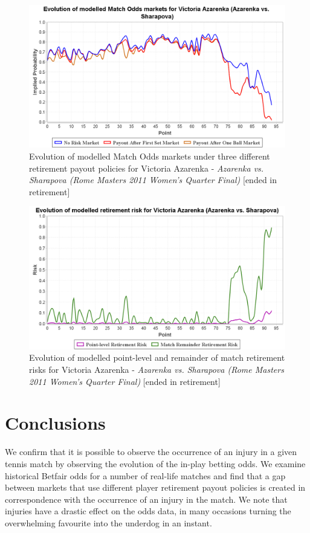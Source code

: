\documentclass[authoryear, 12pt]{elsarticle}
\begin{document}
\begin{figure}[H]
  \centering \includegraphics[width=12.3cm]{matches/azarenkasharapovamodel}
  \caption{Evolution of modelled Match Odds markets under three different retirement payout policies for Victoria Azarenka - \textit{Azarenka vs. Sharapova (Rome Masters 2011 Women's Quarter Final)} [ended in retirement]}
  \label{azarenkasharapovamodel}
\end{figure}

\begin{figure}[H]
  \centering \includegraphics[width=12.3cm]{matches/azarenkasharapovarisk}
  \caption{Evolution of modelled point-level and remainder of match retirement risks for Victoria Azarenka - \textit{Azarenka vs. Sharapova (Rome Masters 2011 Women's Quarter Final)} [ended in retirement]}
  \label{azarenkasharapovarisk}
\end{figure}

\section{Conclusions}

We confirm that it is possible to observe the occurrence of an injury in a given tennis match by observing the evolution of the in-play betting odds.  We examine historical Betfair odds for a number of real-life matches and find that a gap between markets that use different player retirement payout policies is created in correspondence with the occurrence of an injury in the match.  We note that injuries have a drastic effect on the odds data, in many occasions turning the overwhelming favourite into the underdog in an instant.
\end{document}
